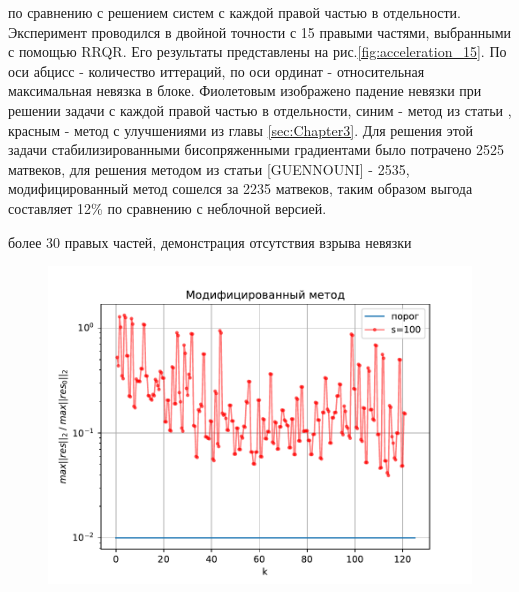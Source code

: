 по сравнению с решением систем с каждой правой частью в отдельности. Эксперимент проводился в двойной точности с 15 правыми частями,
выбранными с помощью RRQR. Его результаты представлены на рис.\ref{fig:acceleration_15}. По оси абцисс - количество иттераций, по оси
ординат - относительная максимальная невязка в блоке. Фиолетовым изображено падение невязки при решении задачи с каждой правой частью 
в отдельности, синим - метод из статьи \cite{elGuennouni2003}, красным - метод с улучшениями из главы \ref{sec:Chapter3}. Для решения этой задачи
стабилизированными бисопряженными градиентами было потрачено 2525 матвеков, для решения методом из статьи [GUENNOUNI] - 2535, модифицированный
метод сошелся за 2235 матвеков, таким образом выгода составляет 12\% по сравнению с неблочной версией.
\par более 30 правых частей, демонстрация отсутствия взрыва невязки
\begin{figure}[H]
    \centering
    \includegraphics[width=0.7\linewidth]{images/100_rhs.pdf}
    \caption{}
    \label{fig:100_rhs}
\end{figure}

\newpage
